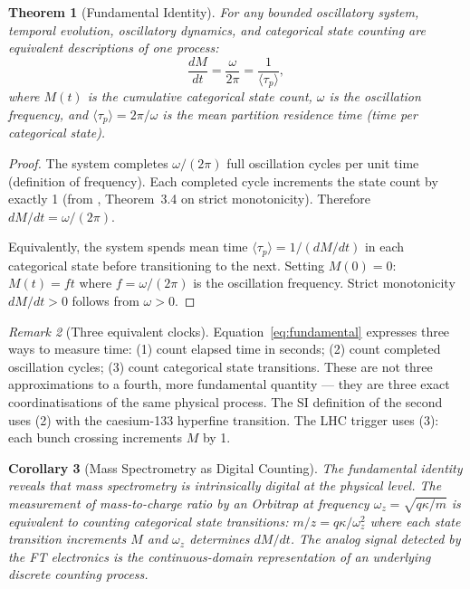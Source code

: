 \documentclass[twocolumn,10pt,a4paper]{article}
\theoremstyle{thmstyle}
\newtheorem{theorem}{Theorem}[section]
\newtheorem{corollary}[theorem]{Corollary}
\theoremstyle{definition}
\theoremstyle{remark}
\newtheorem{remark}[theorem]{Remark}
\begin{document}
\begin{theorem}[Fundamental Identity]
\label{thm:fundamental_identity}
For any bounded oscillatory system, temporal evolution, oscillatory
dynamics, and categorical state counting are equivalent descriptions
of one process:
\begin{equation}
\frac{dM}{dt} = \frac{\omega}{2\pi} = \frac{1}{\langle\tau_p\rangle},
\label{eq:fundamental}
\end{equation}
where $M(t)$ is the cumulative categorical state count, $\omega$ is the
oscillation frequency, and $\langle\tau_p\rangle = 2\pi/\omega$ is the
mean partition residence time (time per categorical state).
\end{theorem}

\begin{proof}
The system completes $\omega/(2\pi)$ full oscillation cycles per unit time
(definition of frequency). Each completed cycle increments the state count
by exactly 1 (from \citealt{companion:math}, Theorem~3.4 on strict
monotonicity). Therefore $dM/dt = \omega/(2\pi)$.

Equivalently, the system spends mean time $\langle\tau_p\rangle = 1/(dM/dt)$
in each categorical state before transitioning to the next.
Setting $M(0) = 0$: $M(t) = ft$ where $f = \omega/(2\pi)$ is the
oscillation frequency. Strict monotonicity $dM/dt > 0$ follows from $\omega > 0$.
\end{proof}

\begin{remark}[Three equivalent clocks]
Equation~\eqref{eq:fundamental} expresses three ways to measure time:
(1) count elapsed time in seconds;
(2) count completed oscillation cycles;
(3) count categorical state transitions.
These are not three approximations to a fourth, more fundamental quantity —
they are three exact coordinatisations of the same physical process.
The SI definition of the second uses (2) with the caesium-133 hyperfine
transition. The LHC trigger uses (3): each bunch crossing increments $M$ by 1.
\end{remark}

\begin{corollary}[Mass Spectrometry as Digital Counting]
\label{cor:digital_ms}
The fundamental identity reveals that mass spectrometry is intrinsically
digital at the physical level. The measurement of mass-to-charge ratio
by an Orbitrap at frequency $\omega_z = \sqrt{q\kappa/m}$ is equivalent
to counting categorical state transitions: $m/z = q\kappa/\omega_z^2$
where each state transition increments $M$ and $\omega_z$ determines
$dM/dt$. The analog signal detected by the FT electronics is the
continuous-domain representation of an underlying discrete counting process.
\end{corollary}
\end{document}
